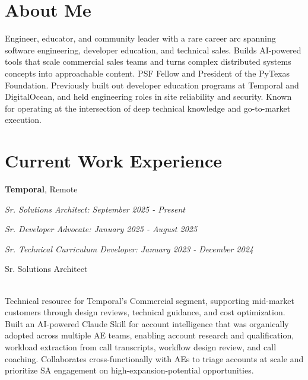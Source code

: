 \documentclass[10pt]{article} %
\begin{document}
\begin{minipage}[t]{0.5\textwidth} %
\vspace{0pt} %
    
\section{About Me}
Engineer, educator, and community leader with a rare career arc spanning software engineering, developer education, and technical sales. Builds AI-powered tools that scale commercial sales teams and turns complex distributed systems concepts into approachable content. PSF Fellow and President of the PyTexas Foundation. Previously built out developer education programs at Temporal and DigitalOcean, and held engineering roles in site reliability and security. Known for operating at the intersection of deep technical knowledge and go-to-market execution. \\


\section{Current Work Experience} 


{\raggedright\Large \textbf{Temporal}, Remote\\
\raggedright\small \textit{Sr. Solutions Architect: September 2025 - Present}\\
\raggedright\small \textit{Sr. Developer Advocate: January 2025 - August 2025}\\
\raggedright\small \textit{Sr. Technical Curriculum Developer: January 2023 - December 2024}\\[5pt]}

{\raggedright\large Sr. Solutions Architect} \\
\normalsize{
    Technical resource for Temporal's Commercial segment, supporting mid-market customers through design reviews, technical guidance, and cost optimization. Built an AI-powered Claude Skill for account intelligence that was organically adopted across multiple AE teams, enabling account research and qualification, workload extraction from call transcripts, workflow design review, and call coaching. Collaborates cross-functionally with AEs to triage accounts at scale and prioritize SA engagement on high-expansion-potential opportunities.
} \\


\end{minipage}
\end{document}
